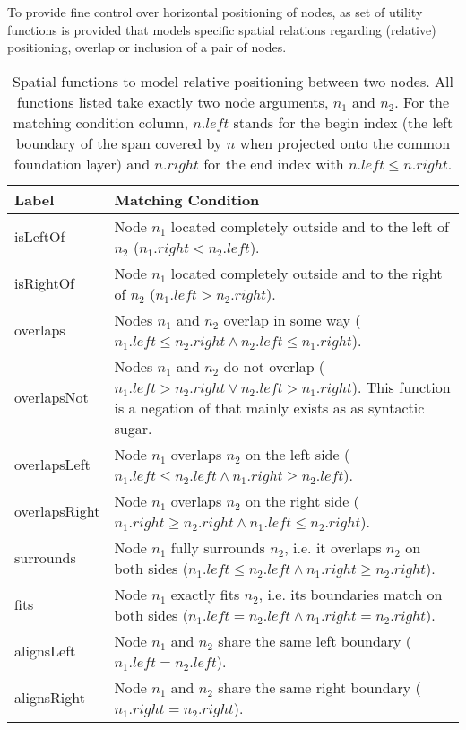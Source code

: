 \documentclass[11pt,a4paper]{article}
\begin{document}
To provide fine control over horizontal positioning of nodes, as set of utility functions is provided that models specific spatial relations regarding (relative) positioning, overlap or inclusion of a pair of nodes.

\begin{table}[!htb]\centering
\begin{tabular}{|p{}|p{}|}
	\hline 
	\textbf{Label} &  \textbf{Matching Condition} \\ 
	\hline 
	\hline  
	isLeftOf  & Node $n_1$ located completely outside and to the left of $n_2$ ($n_{1}.right < n_{2}.left$). \\  
	\hline  
	isRightOf  & Node $n_1$ located completely outside and to the right of $n_2$ ($n_{1}.left > n_{2}.right$). \\ 
	\hline  
	overlaps  & Nodes $n_1$ and $n_2$ overlap in some way ($n_{1}.left \le n_{2}.right \land n_{2}.left \le n_{1}.right$). \\ 
	\hline  
	overlapsNot  & Nodes $n_1$ and $n_2$ do not overlap ($n_{1}.left > n_{2}.right \lor n_{2}.left > n_{1}.right$). This function is a negation of \query{overlaps} that mainly exists as as syntactic sugar. \\  
	\hline 
	overlapsLeft  & Node $n_1$ overlaps $n_2$ on the left side ($n_{1}.left \le n_{2}.left \land n_{1}.right \ge n_{2}.left$). \\ 
	\hline 
	overlapsRight  & Node $n_1$ overlaps $n_2$ on the right side ($n_{1}.right \ge n_{2}.right \land n_{1}.left \le n_{2}.right$). \\ %
	\hline 
	surrounds  & Node $n_1$ fully surrounds $n_2$, i.e. it overlaps $n_2$ on both sides ($n_{1}.left \le n_{2}.left \land n_{1}.right \ge n_{2}.right$). \\ 
	\hline 
	fits  & Node $n_1$ exactly fits $n_2$, i.e. its boundaries match on both sides ($n_{1}.left = n_{2}.left \land n_{1}.right = n_{2}.right$). \\ 
	\hline 
	alignsLeft  & Node $n_1$ and $n_2$ share the same left boundary ($n_{1}.left = n_{2}.left$). \\ 
	\hline 
	alignsRight  & Node $n_1$ and $n_2$ share the same right boundary ($n_{1}.right = n_{2}.right$). \\ 
	\hline 
\end{tabular}
\caption[Spatial functions]{Spatial functions to model relative positioning between two nodes. All functions listed take exactly two node arguments, $n_1$ and $n_2$. For the matching condition column, $n.left$ stands for the begin index (the left boundary of the span covered by $n$ when projected onto the common foundation layer) and $n.right$ for the end index with $n.left \leq n.right$.}
\label{tab:spatial-functions}
\end{table}
\end{document}
